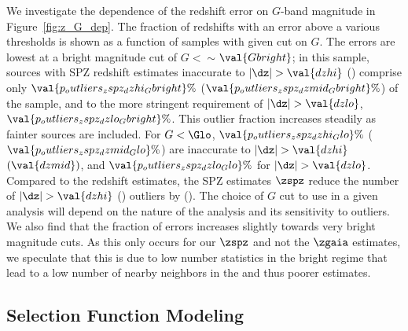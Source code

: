 We investigate the dependence of the redshift error on $G$-band magnitude in Figure~\ref{fig:z_G_dep}.
The fraction of redshifts with an error above a various thresholds is shown as a function of samples with given cut on $G$.
The errors are lowest at a bright magnitude cut of $G < \sim$$\val{Gbright}$; in this sample, sources with SPZ redshift estimates inaccurate to $|\dz|>\val{dzhi}$ () comprise only $\val{p_outliers_zspz_dzhi_Gbright}\%$ ($\val{p_outliers_zspz_dzmid_Gbright}\%$) of the sample, and to the more stringent requirement of $|\dz|>\val{dzlo}$, $\val{p_outliers_zspz_dzlo_Gbright}\%$.
This outlier fraction increases steadily as fainter sources are included.
For $G<\Glo$, $\val{p_outliers_zspz_dzhi_Glo}\%$ ($\val{p_outliers_zspz_dzmid_Glo}\%$) are inaccurate to $|\dz|>\val{dzhi}$ $(\val{dzmid})$, and $\val{p_outliers_zspz_dzlo_Glo}\%$ for $|\dz|>\val{dzlo}$.
Compared to the \Gaia redshift estimates, the SPZ estimates $\zspz$ reduce the number of $|\dz|>\val{dzhi}$ () outliers by  ().
The choice of $G$ cut to use in a given analysis will depend on the nature of the analysis and its sensitivity to outliers. 
We also find that the fraction of errors increases slightly towards very bright magnitude cuts.
As this only occurs for our $\zspz$ and not the $\zgaia$ estimates, we speculate that this is due to low number statistics in the bright regime that lead to a low number of nearby neighbors in the \knn and thus poorer estimates.


\subsection{Selection Function Modeling}
\label{sec:selfunc_methods}

